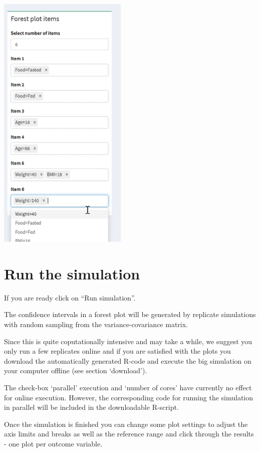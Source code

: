 \documentclass[
]{book}
\begin{document}
\includegraphics[width=2.42708in,height=\textheight]{pictures/forest_plot_items.png}

\section{Run the simulation}\label{run-the-simulation}

If you are ready click on ``Run simulation''.

The confidence intervals in a forest plot will be generated by replicate simulations with random sampling from the variance-covariance matrix.

Since this is quite coputationally intensive and may take a while, we suggest you only run a few replicates online and if you are satisfied with the plots you download the automatically generated R-code and execute the big simulation on your computer offline (see section `download').

The check-box `parallel' execution and `number of cores' have currently no effect for online execution. However, the corresponding code for running the simulation in parallel will be included in the downloadable R-script.

Once the simulation is finished you can change some plot settings to adjust the axis limits and breaks as well as the reference range and click through the results - one plot per outcome variable.
\end{document}
